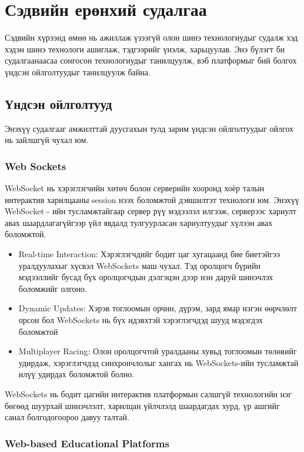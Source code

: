 \chapter{Сэдвийн ерөнхий судалгаа}

Сэдвийн хүрээнд өмнө нь ажиллаж үзээгүй олон шинэ технологиудыг судалж хэд хэдэн шинэ технологи ашиглаж, тэдгээрийг үнэлж, харьцуулав. Энэ бүлэгт би судалгаанаасаа сонгосон технологиудыг танилцуулж, вэб платформыг бий болгох үндсэн ойлголтуудыг танилцуулж байна.

\section{Үндсэн ойлголтууд}

Энэхүү судалгааг амжилттай дуусгахын тулд зарим үндсэн ойлголтуудыг ойлгох нь зайлшгүй чухал юм.

\subsection{Web Sockets}

WebSocket нь хэрэглэгчийн хөтөч болон серверийн хооронд хоёр талын интерактив харилцааны session нээх боломжтой дэвшилтэт технологи юм. Энэхүү WebSocket - ийн тусламжтайгаар сервер рүү мэдээлэл илгээж, серверээс хариулт авах шаардлагагүйгээр үйл явдалд тулгуурласан хариултуудыг хүлээн авах боломжтой.

\begin{itemize}

	\item Real-time Interaction: Хэрэглэгчдийг бодит цаг хугацаанд бие биетэйгээ уралдуулахыг хүсвэл WebSockets маш чухал. Тэд оролцогч бүрийн мэдээллийг бусад бүх оролцогчдын дэлгэцэн дээр нэн даруй шинэчлэх боломжийг олгоно.
	\item Dynamic Updates: Хэрэв тоглоомын орчин, дүрэм, зард ямар нэгэн өөрчлөлт орсон бол WebSockets нь бүх идэвхтэй хэрэглэгчдэд шууд мэдэгдэх боломжтой
	\item Multiplayer Racing: Олон оролцогчтой уралдааны хувьд тоглоомын төлөвийг удирдаж, хэрэглэгчдэд синхрончлолыг хангах нь WebSockets-ийн тусламжтай илүү удирдах боломжтой болно.
\end{itemize}

WebSockets нь бодит цагийн интерактив платформын салшгүй технологийн нэг бөгөөд шуурхай шинэчлэлт, харилцан үйлчлэлд шаардагдах хурд, үр ашгийг санал болгодогоороо давуу талтай.

\subsection{Web-based Educational Platforms}


